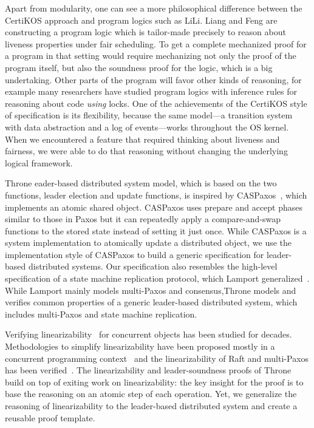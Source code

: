 Apart from modularity, one can see a more philosophical difference
between the CertiKOS approach and program logics such as LiLi.  Liang
and Feng are constructing a program logic which is tailor-made
precisely to reason about liveness properties under fair
scheduling. To get a complete mechanized proof for a program in that
setting would require mechanizing not only the proof of the program
itself, but also the soundness proof for the logic, which is a big
undertaking. Other parts of the program will favor other kinds of
reasoning, for example many researchers have studied program logics
with inference rules for reasoning about code \emph{using} locks. One
of the achievements of the CertiKOS style of specification is its
flexibility, because the same model---a transition system with data
abstraction and a log of events---works throughout the OS kernel. When
we encountered a feature that required thinking about liveness and
fairness, we were able to do that reasoning without changing the
underlying logical framework.



Throne eader-based distributed system model, which is based on the two functions,
leader election and update functions, is inspired by CASPaxos~\cite{caspaxos},
which implements an atomic shared object. CASPaxos uses prepare and accept
phases similar to those in Paxos but it can repeatedly apply a compare-and-swap
functions to the stored state instead of setting it just once. While CASPaxos is a system implementation
to atomically update a distributed object, we use the implementation style of
CASPaxos to build a generic specification for leader-based distributed systems.
Our specification also resembles the high-level specification of a state machine
replication protocol, which Lamport generalized~\cite{generalizedconsensus}.
While Lamport mainly models multi-Paxos and consensus,Throne models and
verifies common properties of a generic leader-based distributed system,
which includes multi-Paxos and state machine replication.

Verifying linearizability~\cite{herlihy90} for concurrent objects has been
studied for decades. Methodologies to simplify linearizability have been
proposed mostly in a concurrent programming context~\cite{Elmas10tacas,
Liang13pldi,Gotsman12concur,Viktor10CAV} and the linearizability of Raft and
multi-Paxos has been verified~\cite{cppraft, ironfleet}. The linearizability
and leader-soundness proofs of Throne build on top of exiting work on
linearizability: the key insight for the proof is to base the reasoning on
an atomic step of each operation.  Yet, we generalize the reasoning of linearizability
to the leader-based distributed system and create a reusable proof template.

